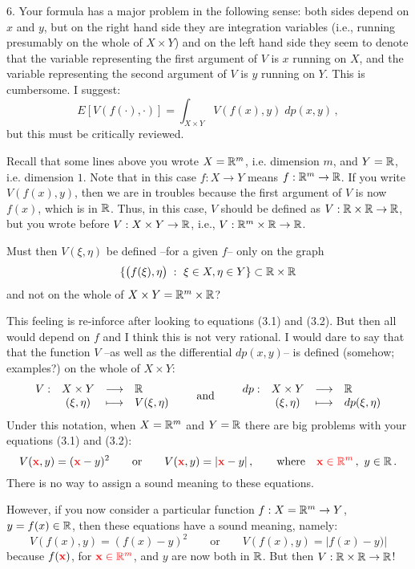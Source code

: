 \begin{description}[style=unboxed,leftmargin=0cm,itemsep=3ex]
6. Your formula has a major problem in the following sense: both sides
depend on $x$ and $y$, but on the right hand side they are integration
variables (i.e., running presumably on the whole of $X\times Y$) and
on the left hand side they seem to denote that the variable representing
the first argument of $V$ is $x$ running on $X$, and the variable
representing the second argument of $V$ is $y$ running on $Y$.
This is cumbersome.
I suggest:
$$
E[V(f(\cdot),\cdot)] = \int_{X\times Y} V(f(x),y)\;dp(x,y)\,,
$$
but this must be critically reviewed.

Recall that some lines above you wrote $X={\mathbb R }^m$, i.e. dimension $m$,
and $Y={\mathbb R }$, i.e. dimension $1$.
Note that in this case $f:X\to Y$ means $f:{\mathbb R }^m\to{\mathbb R }$.
If you write $V(f(x),y)$, then we are in troubles because the first
argument of $V$ is now $f(x)$, which is in ${\mathbb R }$.
Thus, in this case, $V$ should be defined as $V:{\mathbb R }\times{\mathbb R }\to{\mathbb R }$,
but you wrote before $V:X\times Y\to{\mathbb R }$, i.e., $V:{\mathbb R }^m\times{\mathbb R }\to{\mathbb R }$.

Must then $V(\xi,\eta)$ be defined --for a given $f$-- only on the graph 
$$
\{ \big( f(\xi),\eta \big)\;:\  \xi\in X, \eta\in Y \}\subset{\mathbb R }\times{\mathbb R }
$$
and not on the whole of $X\times Y={\mathbb R }^m\times{\mathbb R }$?

This feeling is re-inforce after looking to equations (3.1) and (3.2).
But then all would depend on $f$ and I think this is not very rational.
I would dare to say that that the function $V$ --as well as the differential
$dp(x,y)$-- is defined (somehow; examples?) on the whole of $X\times Y$:
$$
\begin{array}{rccl}
V: & X\times Y  & \longrightarrow & {\mathbb R }     \\
   & (\xi,\eta) & \longmapsto     & V(\xi,\eta)
\end{array}
\qquad\text{and}\qquad
\begin{array}{rccl}
dp: & X\times Y  & \longrightarrow & {\mathbb R }     \\
    & (\xi,\eta) & \longmapsto     & dp(\xi,\eta)
\end{array}
$$
Under this notation, when $X={\mathbb R }^m$ and $Y={\mathbb R }$ there are big problems
with your equations (3.1) and (3.2):
$$
V({\color{red} \mathbf{x}},y)=({\color{red} \mathbf{x}}-y)^2 
\qquad\text{or}\qquad 
V({\color{red} \mathbf{x}},y)=|{\color{red} \mathbf{x}}-y|\,,
\qquad\text{where}\quad{\color{red} \mathbf{x}\in{\mathbb R }^m}\,,\ y\in{\mathbb R }\,.
$$
There is no way to assign a sound meaning to these equations.

However, if you now consider a particular function 
$f:X={\mathbb R }^m\to Y$, $y=f(x)\in{\mathbb R }$, then these equations  have a
sound meaning, namely:
$$
V(f(x),y)=(f(x)-y)^2 \qquad\text{or}\qquad V(f(x),y)=|f(x)-y)|
$$
because $f({\color{red} \mathbf{x}})$, for ${\color{red} \mathbf{x}\in{\mathbb R }^m}$,
and $y$ are now both in ${\mathbb R }$.
But then $V:{\mathbb R }\times{\mathbb R }\to{\mathbb R }$!


\end{description}
